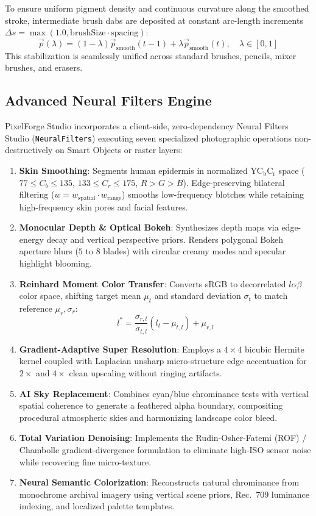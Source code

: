 \documentclass[10pt,journal,compsoc]{IEEEtran}
\begin{document}
To ensure uniform pigment density and continuous curvature along the smoothed stroke, intermediate brush dabs are deposited at constant arc-length increments $\Delta s = \max(1.0, \text{brushSize} \cdot \text{spacing})$:
\begin{equation}
\vec{p}(\lambda) = (1 - \lambda)\vec{p}_{\text{smooth}}(t-1) + \lambda \vec{p}_{\text{smooth}}(t), \quad \lambda \in [0, 1]
\end{equation}
This stabilization is seamlessly unified across standard brushes, pencils, mixer brushes, and erasers.

\subsection{Advanced Neural Filters Engine}
PixelForge Studio incorporates a client-side, zero-dependency Neural Filters Studio (\texttt{NeuralFilters}) executing seven specialized photographic operations non-destructively on Smart Objects or raster layers:
\begin{enumerate}
    \item \textbf{Skin Smoothing}: Segments human epidermis in normalized $\text{YC}_\text{b}\text{C}_\text{r}$ space ($77 \le C_b \le 135$, $133 \le C_r \le 175$, $R > G > B$). Edge-preserving bilateral filtering ($w = w_{\text{spatial}} \cdot w_{\text{range}}$) smooths low-frequency blotches while retaining high-frequency skin pores and facial features.
    \item \textbf{Monocular Depth & Optical Bokeh}: Synthesizes depth maps via edge-energy decay and vertical perspective priors. Renders polygonal Bokeh aperture blurs ($5$ to $8$ blades) with circular creamy modes and specular highlight blooming.
    \item \textbf{Reinhard Moment Color Transfer}: Converts sRGB to decorrelated $l\alpha\beta$ color space, shifting target mean $\mu_t$ and standard deviation $\sigma_t$ to match reference $\mu_r, \sigma_r$:
    \begin{equation}
    l^* = \frac{\sigma_{r,l}}{\sigma_{t,l}}(l_t - \mu_{t,l}) + \mu_{r,l}
    \end{equation}
    \item \textbf{Gradient-Adaptive Super Resolution}: Employs a $4\times 4$ bicubic Hermite kernel coupled with Laplacian unsharp micro-structure edge accentuation for $2\times$ and $4\times$ clean upscaling without ringing artifacts.
    \item \textbf{AI Sky Replacement}: Combines cyan/blue chrominance tests with vertical spatial coherence to generate a feathered alpha boundary, compositing procedural atmospheric skies and harmonizing landscape color bleed.
    \item \textbf{Total Variation Denoising}: Implements the Rudin-Osher-Fatemi (ROF) / Chambolle gradient-divergence formulation to eliminate high-ISO sensor noise while recovering fine micro-texture.
    \item \textbf{Neural Semantic Colorization}: Reconstructs natural chrominance from monochrome archival imagery using vertical scene priors, Rec.~709 luminance indexing, and localized palette templates.
\end{enumerate}
\end{document}
